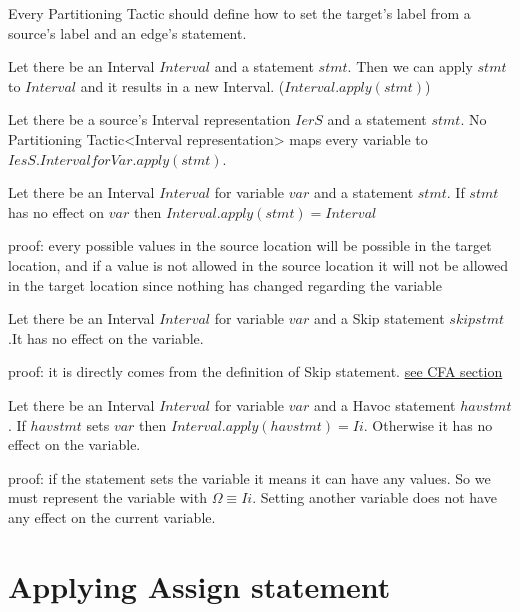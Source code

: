 Every Partitioning Tactic should define how to set the target's label from a source's label and an edge's statement.

\begin{definition}
	Let there be an Interval $Interval$ and a statement $stmt$. Then we can apply $stmt$ to $Interval$ and it results in a new Interval. ($Interval.apply(stmt)$)
\end{definition}

Let there be a source's Interval representation $IerS$ and a statement $stmt$. No Partitioning Tactic<Interval representation> maps every variable to $IesS.IntervalforVar.apply(stmt)$.

\begin{theorem}
	Let there be an Interval $Interval$ for variable $var$ and a statement $stmt$. If $stmt$ has no effect on $var$ then
	$Interval.apply(stmt)=Interval$ 
\end{theorem}

{proof: } every possible values in the source location will be possible in the target location, and if a value is not allowed in the source location it will not be allowed in the target location since nothing has changed regarding the variable

\begin{theorem}
	Let there be an Interval $Interval$ for variable $var$ and a Skip statement $skipstmt$.It has no effect on the variable.
\end{theorem}
{proof: }it is directly comes from the definition of Skip statement. \hyperref[sec:cfaleiras]{see CFA section}

\begin{theorem}
	Let there be an Interval $Interval$ for variable $var$ and a Havoc statement $havstmt$. If $havstmt$ sets $var$ then
	$Interval.apply(havstmt)=Ii$. Otherwise it has no effect on the variable.
\end{theorem}

{proof: } if the statement sets the variable it means it can have any values. So we must represent the variable with $\Omega \equiv Ii$. Setting another variable does not have any effect on the current variable.


\section{Applying Assign statement}


